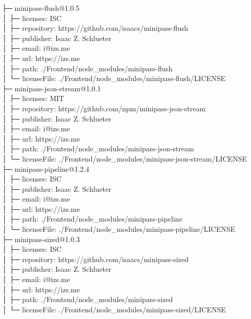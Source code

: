 \documentclass[
    paper=a4,
    twoside=false,
    parskip=half,
    listof=entryprefix,
    listof=totoc,
    index=totoc,
    bibliography=totoc,
    headsepline,
]{scrbook}
\begin{document}
    ├─ minipass-flush@1.0.5\\
    │  ├─ licenses: ISC\\
    │  ├─ repository: https://github.com/isaacs/minipass-flush\\
    │  ├─ publisher: Isaac Z. Schlueter\\
    │  ├─ email: i@izs.me\\
    │  ├─ url: https://izs.me\\
    │  ├─ path: ./Frontend/node\_modules/minipass-flush\\
    │  └─ licenseFile: ./Frontend/node\_modules/minipass-flush/LICENSE\\
    ├─ minipass-json-stream@1.0.1\\
    │  ├─ licenses: MIT\\
    │  ├─ repository: https://github.com/npm/minipass-json-stream\\
    │  ├─ publisher: Isaac Z. Schlueter\\
    │  ├─ email: i@izs.me\\
    │  ├─ url: https://izs.me\\
    │  ├─ path: ./Frontend/node\_modules/minipass-json-stream\\
    │  └─ licenseFile: ./Frontend/node\_modules/minipass-json-stream/LICENSE\\
    ├─ minipass-pipeline@1.2.4\\
    │  ├─ licenses: ISC\\
    │  ├─ publisher: Isaac Z. Schlueter\\
    │  ├─ email: i@izs.me\\
    │  ├─ url: https://izs.me\\
    │  ├─ path: ./Frontend/node\_modules/minipass-pipeline\\
    │  └─ licenseFile: ./Frontend/node\_modules/minipass-pipeline/LICENSE\\
    ├─ minipass-sized@1.0.3\\
    │  ├─ licenses: ISC\\
    │  ├─ repository: https://github.com/isaacs/minipass-sized\\
    │  ├─ publisher: Isaac Z. Schlueter\\
    │  ├─ email: i@izs.me\\
    │  ├─ url: https://izs.me\\
    │  ├─ path: ./Frontend/node\_modules/minipass-sized\\
    │  └─ licenseFile: ./Frontend/node\_modules/minipass-sized/LICENSE\\
\end{document}
